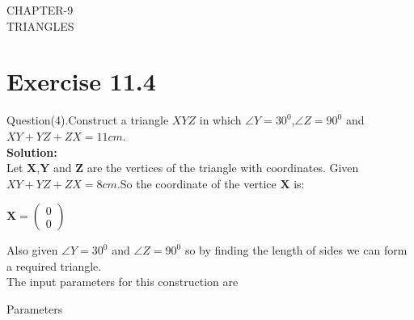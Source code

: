 \documentclass{article}
\newcommand{\myvec}[1]{\ensuremath{\begin{pmatrix}#1\end{pmatrix}}}
\let\vec\mathbf
\begin{document}
\begin{center}
        \textbf\large{CHAPTER-9 \\ TRIANGLES}
\end{center}
\section{Exercise 11.4}
Question(4).Construct a triangle $XYZ$ in which $\angle{Y}=30^0$,$\angle{Z}=90^0$ and $XY+YZ+ZX=11cm$. \\

\textbf{Solution:}\\
Let $\vec{X}$,$\vec{Y}$ and $\vec{Z}$ are the vertices of the triangle with coordinates.
Given $XY+YZ+ZX=8cm$.So the coordinate of the vertice  $\vec{X}$ is:
\begin{center}
{
$\vec{X} =\myvec{0\\0}$
}
\end{center}
Also given $\angle{Y}=30^0$ and $\angle{Z}=90^0$ so by finding the length of sides we can form a required triangle. \\
 The input parameters for this construction are\\
 \begin{table}[h]
	 \centering
	 
	 \caption{Parameters}
	 \label{tab:table1}
 \end{table}\\
\end{document}
